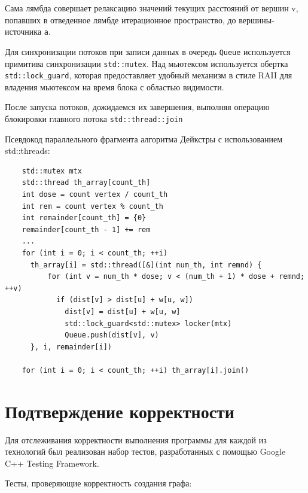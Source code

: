 \documentclass{article}
\begin{document}
\par Сама лямбда совершает релаксацию значений текущих расстояний от вершин v, попавших в отведенное лямбде итерационное пространство, до вершины-источника \verb|a|.

\par Для синхронизации потоков при записи данных в очередь \verb|Queue| используется примитива синхронизации \verb|std::mutex|. Над мьютексом используется обертка \verb|std::lock_guard|, которая предоставляет удобный механизм в стиле RAII для владения мьютексом на время блока с областью видимости.

\par После запуска потоков, дожидаемся их завершения, выполняя операцию блокировки главного потока \verb|std::thread::join|

\par Псевдокод параллельного фрагмента алгоритма Дейкстры с использованием std::threads:

\vspace{10pt}
\begin{lstlisting}
    std::mutex mtx
    std::thread th_array[count_th]
    int dose = count vertex / count_th
    int rem = count vertex % count_th
    int remainder[count_th] = {0}
    remainder[count_th - 1] += rem
    ...
    for (int i = 0; i < count_th; ++i)
      th_array[i] = std::thread([&](int num_th, int remnd) {
          for (int v = num_th * dose; v < (num_th + 1) * dose + remnd; ++v)
            if (dist[v] > dist[u] + w[u, w])
              dist[v] = dist[u] + w[u, w]
              std::lock_guard<std::mutex> locker(mtx)
              Queue.push(dist[v], v)
      }, i, remainder[i])
          
    for (int i = 0; i < count_th; ++i) th_array[i].join()
\end{lstlisting}
\vspace{-25pt}

\newpage

\section{Подтверждение корректности}
Для отслеживания корректности выполнения программы для каждой из технологий был реализован набор тестов, разработанных с помощью Google C++ Testing Framework.

\par Тесты, проверяющие корректность создания графа:
\end{document}
